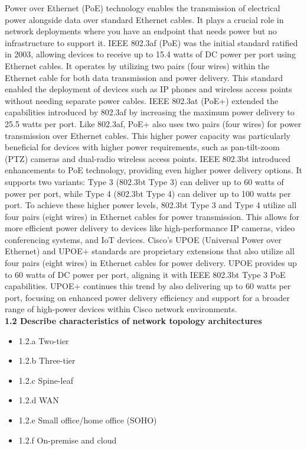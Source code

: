 \documentclass{article}
\begin{document}
	Power over Ethernet (PoE) technology enables the transmission of electrical power alongside data over standard Ethernet cables. It plays a crucial role in network deployments where you have an endpoint that needs power but no infrastructure to support it. IEEE 802.3af (PoE) was the initial standard ratified in 2003, allowing devices to receive up to 15.4 watts of DC power per port using Ethernet cables. It operates by utilizing two pairs (four wires) within the Ethernet cable for both data transmission and power delivery. This standard enabled the deployment of devices such as IP phones and wireless access points without needing separate power cables. IEEE 802.3at (PoE+) extended the capabilities introduced by 802.3af by increasing the maximum power delivery to 25.5 watts per port. Like 802.3af, PoE+ also uses two pairs (four wires) for power transmission over Ethernet cables. This higher power capacity was particularly beneficial for devices with higher power requirements, such as pan-tilt-zoom (PTZ) cameras and dual-radio wireless access points. IEEE 802.3bt introduced enhancements to PoE technology, providing even higher power delivery options. It supports two variants: Type 3 (802.3bt Type 3) can deliver up to 60 watts of power per port, while Type 4 (802.3bt Type 4) can deliver up to 100 watts per port. To achieve these higher power levels, 802.3bt Type 3 and Type 4 utilize all four pairs (eight wires) in Ethernet cables for power transmission. This allows for more efficient power delivery to devices like high-performance IP cameras, video conferencing systems, and IoT devices. Cisco's UPOE (Universal Power over Ethernet) and UPOE+ standards are proprietary extensions that also utilize all four pairs (eight wires) in Ethernet cables for power delivery. UPOE provides up to 60 watts of DC power per port, aligning it with IEEE 802.3bt Type 3 PoE capabilities. UPOE+ continues this trend by also delivering up to 60 watts per port, focusing on enhanced power delivery efficiency and support for a broader range of high-power devices within Cisco network environments.\\
  

\textbf{1.2 Describe characteristics of network topology architectures}
\begin{itemize}
\item 1.2.a Two-tier
\item 1.2.b Three-tier
\item 1.2.c Spine-leaf
\item 1.2.d WAN
\item 1.2.e Small office/home office (SOHO)
\item 1.2.f On-premise and cloud
\end{itemize}
  
\end{document}

